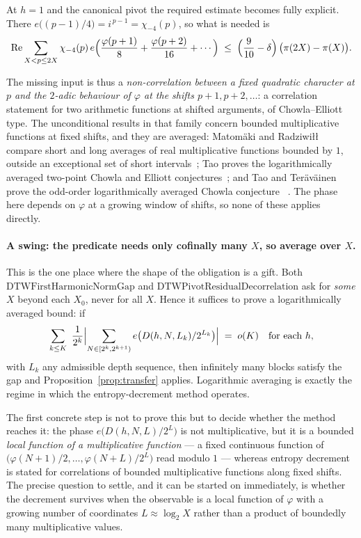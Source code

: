 At $h=1$ and the canonical pivot the required estimate becomes fully
explicit. There $e\bigl((p-1)/4\bigr)=i^{\,p-1}=\chi_{-4}(p)$, so what is
needed is
\[
  \operatorname{Re}\sum_{X<p\le 2X}\chi_{-4}(p)\,
    e\Bigl(\frac{\varphi(p+1)}{8}+\frac{\varphi(p+2)}{16}+\cdots\Bigr)
  \;\le\;\Bigl(\frac{9}{10}-\delta\Bigr)\,\bigl(\pi(2X)-\pi(X)\bigr).
\]

The missing input is thus a \emph{non-correlation between a fixed quadratic
character at $p$ and the $2$-adic behaviour of $\varphi$ at the shifts
$p+1,p+2,\dots$}: a correlation statement for two arithmetic functions at
shifted arguments, of Chowla--Elliott type. The unconditional results in that
family concern bounded multiplicative functions at fixed shifts, and they are
averaged: Matom\"aki and Radziwi\l{}\l{} compare short and long averages of
real multiplicative functions bounded by $1$, outside an exceptional set of
short intervals~\cite[Theorem~1]{matomaki-radziwill}; Tao proves the
logarithmically averaged two-point Chowla and Elliott
conjectures~\cite[Theorems~1.2--1.3]{tao-elliott}; and Tao and Ter\"av\"ainen
prove the odd-order logarithmically averaged Chowla
conjecture~\cite[Theorem~1.1]{tao-teravainen} . The phase here
depends on $\varphi$ at a growing window of shifts, so none of these applies
directly.

\paragraph{A swing: the predicate needs only cofinally many $X$, so average
over $X$.} This is the one place where the shape of the obligation is a gift.
Both $\mathrm{DTWFirstHarmonicNormGap}$ and
$\mathrm{DTWPivotResidualDecorrelation}$ ask for \emph{some} $X$ beyond each
$X_0$, never for all $X$. Hence it suffices to prove a logarithmically
averaged bound: if
\[
  \sum_{k\le K}\ \frac{1}{2^{k}}
  \Bigl|\sum_{N\in[2^{k},2^{k+1})}e\bigl(D(h,N,L_k)/2^{L_k}\bigr)\Bigr|
  \;=\;o(K)
  \quad\text{for each }h,
\]
with $L_k$ any admissible depth sequence, then infinitely many blocks satisfy
the gap and Proposition~\ref{prop:transfer} applies. Logarithmic averaging is
exactly the regime in which the entropy-decrement method operates.

The first
concrete step is not to prove this but to decide whether the method reaches
it: the phase $e\bigl(D(h,N,L)/2^{L}\bigr)$ is not multiplicative, but it is
a bounded \emph{local function of a multiplicative function} --- a fixed
continuous function of $\bigl(\varphi(N+1)/2,\dots,\varphi(N+L)/2^{L}\bigr)$
read modulo $1$ --- whereas entropy decrement is stated for correlations of
bounded multiplicative functions along fixed shifts. The precise question to
settle, and it can be started on immediately, is whether the decrement
survives when the observable is a local function of $\varphi$ with a growing
number of coordinates $L\approx\log_2X$ rather than a product of boundedly
many multiplicative values. 

